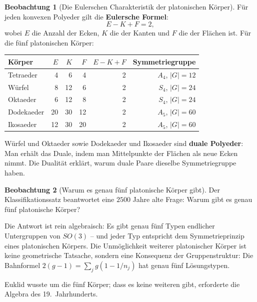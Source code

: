 ﻿\documentclass[a4paper,12pt]{report}
\theoremstyle{definition}
\newtheorem{beobachtung}{Beobachtung}
\begin{document}
\begin{beobachtung}[Die Eulerschen Charakteristik der platonischen Körper]
    Für jeden konvexen Polyeder gilt die \textbf{Eulersche Formel}:
    \[
        E - K + F = 2,
    \]
    wobei $E$ die Anzahl der Ecken, $K$ die der Kanten und $F$ die
    der Flächen ist. Für die fünf platonischen Körper:

    \begin{center}
    \begin{tabular}{lrrrrr}
        \hline
        Körper & $E$ & $K$ & $F$ & $E - K + F$ & Symmetriegruppe \\
        \hline
        Tetraeder  & 4  & 6  & 4  & 2 & $A_4$, $|G|=12$ \\
        Würfel     & 8  & 12 & 6  & 2 & $S_4$, $|G|=24$ \\
        Oktaeder   & 6  & 12 & 8  & 2 & $S_4$, $|G|=24$ \\
        Dodekaeder & 20 & 30 & 12 & 2 & $A_5$, $|G|=60$ \\
        Ikosaeder  & 12 & 30 & 20 & 2 & $A_5$, $|G|=60$ \\
        \hline
    \end{tabular}
    \end{center}

    Würfel und Oktaeder sowie Dodekaeder und Ikosaeder sind
    \textbf{duale Polyeder}: Man erhält das Duale, indem man Mittelpunkte der
    Flächen als neue Ecken nimmt. Die Dualität erklärt, warum duale Paare
    dieselbe Symmetriegruppe haben.
\end{beobachtung}

\begin{beobachtung}[Warum es genau fünf platonische Körper gibt]
    Der Klassifikationssatz beantwortet eine $2500$ Jahre alte Frage:
    Warum gibt es genau fünf platonische Körper?

    Die Antwort ist rein algebraisch: Es gibt genau fünf Typen endlicher
    Untergruppen von $SO(3)$ -- und jeder Typ entspricht dem
    Symmetrieprinzip eines platonischen Körpers. Die Unmöglichkeit
    weiterer platonischer Körper ist keine geometrische Tatsache,
    sondern eine Konsequenz der Gruppenstruktur: Die Bahnformel
    $2(g-1) = \sum_j g(1 - 1/n_j)$ hat genau fünf Lösungstypen.

    Euklid wusste um die fünf Körper; dass es keine weiteren gibt,
    erforderte die Algebra des 19.\ Jahrhunderts.
\end{beobachtung}
\end{document}
